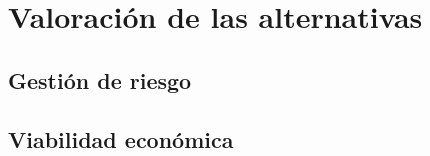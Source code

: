 \documentclass[10pt,a4paper,oldfontcommands]{dpds}
\begin{document}
\pagecolor{fondo}
\color{principal}















\section{Valoración de las alternativas}
\subsection{Gestión de riesgo}
\subsection{Viabilidad económica}


\end{document}
